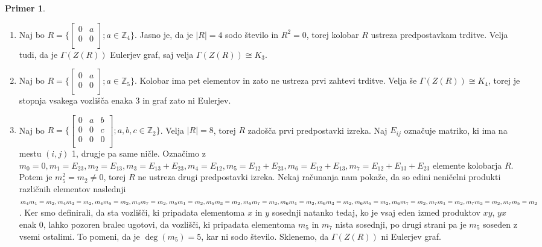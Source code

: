 \documentclass[a4paper, 12pt]{amsart}
\theoremstyle{definition} %
\newtheorem{primer}[definicija]{Primer}
\theoremstyle{plain} %
\newcommand{\Z}{\mathbb Z}
\begin{document}
\begin{primer}
\begin{enumerate}
\item Naj bo $R= \Big\{ 
\begin{bmatrix}
0 & a \\
0 & 0 \\
\end{bmatrix}; a\in \Z_4
\Big\}$. Jasno je, da je $|R| = 4$ sodo število in $R^2=0$, torej kolobar $R$ ustreza predpostavkam trditve. Velja tudi, da je $\Gamma(Z(R))$ Eulerjev graf, saj velja $\Gamma(Z(R)) \cong K_3$.
\item  Naj bo $R= \Big\{ 
\begin{bmatrix}
0 & a \\
0 & 0 \\
\end{bmatrix}; a\in \Z_5
\Big\}$. Kolobar ima pet elementov in zato ne ustreza prvi zahtevi trditve. Velja še $\Gamma(Z(R)) \cong K_4$, torej je stopnja vsakega vozlišča enaka 3 in graf zato ni Eulerjev.
\item Naj bo $R= \Big\{ 
\begin{bmatrix}
0 & a  & b\\
0 & 0 & c\\
0 & 0 & 0\\
\end{bmatrix}; a,b,c\in \Z_2
\Big\}$. Velja $|R|=8$, torej $R$ zadošča prvi predpostavki izreka. Naj $E_{ij}$ označuje matriko, ki ima na mestu $(i,j)$ 1, drugje pa same ničle. Označimo z $m_0 = 0, m_1 = E_{23}, m_2 = E_{13}, m_3 = E_{13}+E_{23}, m_4 = E_{12}, m_5 =  E_{12} + E_{23}, m_6 = E_{12}+E_{13}, m_7 = E_{12}+E_{13}+E_{23}$ elemente kolobarja $R$. Potem je $m_5^2 = m_2\neq 0$, torej $R$ ne ustreza drugi predpostavki izreka. Nekaj računanja nam pokaže, da so edini neničelni produkti različnih elementov naslednji
$
m_4 m_1=m_2, m_4 m_3=m_2, m_4 m_5 = m_2,m_4 m_7 = m_2,m_5 m_1 = m_2, m_5 m_3 = m_2, m_5 m_7 = m_2, m_6 m_1 = m_2, m_6 m_3 = m_2,\\ m_6 m_5 = m_2, m_6 m_7 = m_2, m_7 m_1 = m_2, m_7 m_3 = m_2, m_7 m_5 = m_2
$. Ker smo definirali, da sta vozlišči, ki pripadata elementoma $x$ in $y$ sosednji natanko tedaj, ko je vsaj eden izmed produktov $xy$, $yx$ enak 0, lahko pozoren bralec ugotovi, da vozlišči, ki pripadata elementoma $m_5$ in $m_7$ nista sosednji, po drugi strani pa je $m_5$ soseden z vsemi ostalimi. To pomeni, da je $\deg(m_5) = 5$, kar ni sodo število. Sklenemo, da $\Gamma(Z(R))$ ni Eulerjev graf.
\end{enumerate}
\end{primer}
\end{document}

